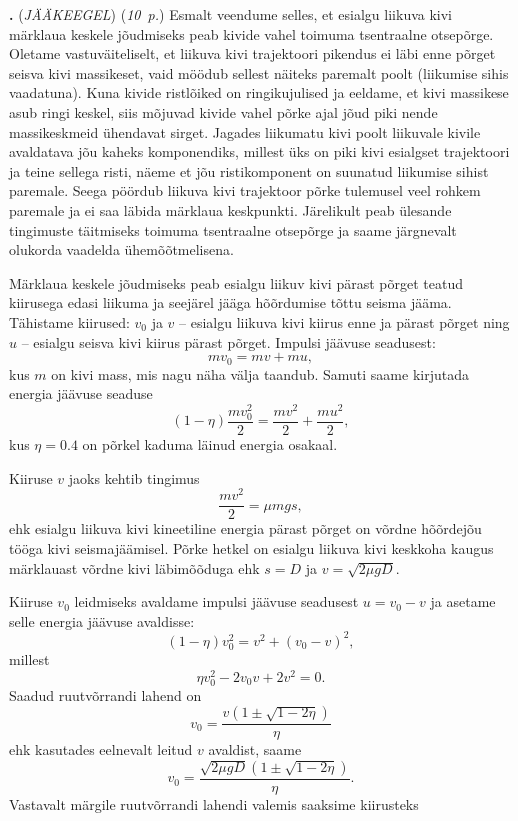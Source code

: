 \documentclass[12pt,a5paper]{article}
\newcommand{\numb}[1]{\vspace{5pt}\textbf{\large #1}}
\newcommand{\nimi}[1]{(\textsl{\small #1})}
\newcommand{\punktid}[1]{(\emph{#1~p.})}
\newcounter{ylesanne}
\newcommand{\yl}[1]{\addtocounter{ylesanne}{1}\numb{\theylesanne.} \nimi{#1} \newblock{}}
\begin{document}
\yl{JÄÄKEEGEL} \punktid{10} Esmalt veendume selles, et esialgu liikuva kivi märklaua keskele jõudmiseks peab kivide vahel toimuma tsentraalne otsepõrge. Oletame vastuväiteliselt, et liikuva kivi trajektoori pikendus ei läbi enne põrget seisva kivi massikeset, vaid möödub sellest näiteks paremalt poolt (liikumise sihis vaadatuna). Kuna kivide ristlõiked on ringikujulised ja eeldame, et kivi massikese asub ringi keskel, siis mõjuvad kivide vahel põrke ajal jõud piki nende massikeskmeid ühendavat sirget. Jagades liikumatu kivi poolt liikuvale kivile avaldatava jõu kaheks komponendiks, millest üks on piki kivi esialgset trajektoori ja teine sellega risti, näeme et jõu ristikomponent on suunatud liikumise sihist paremale. Seega pöördub liikuva kivi trajektoor põrke tulemusel veel rohkem paremale ja ei saa läbida märklaua keskpunkti. Järelikult peab ülesande tingimuste täitmiseks toimuma tsentraalne otsepõrge ja saame järgnevalt olukorda vaadelda ühemõõtmelisena.

Märklaua keskele jõudmiseks peab esialgu liikuv kivi pärast põrget teatud kiirusega edasi liikuma ja seejärel jääga hõõrdumise tõttu seisma jääma. Tähistame kiirused: $v_0$ ja $v$ -- esialgu liikuva kivi kiirus enne ja pärast põrget ning $u$ -- esialgu seisva kivi kiirus pärast põrget. Impulsi jäävuse seadusest:
\begin{equation}
mv_0 = mv + mu,
\end{equation}
kus $m$ on kivi mass, mis nagu näha välja taandub. Samuti saame kirjutada energia jäävuse seaduse
\begin{equation}
\left(1-\eta\right)\frac{mv_0^2}{2} = \frac{mv^2}{2} + \frac{mu^2}{2},
\end{equation}
kus $\eta = \num{0.4}$ on põrkel kaduma läinud energia osakaal.

Kiiruse $v$ jaoks kehtib tingimus
\begin{equation}
\frac{mv^2}{2} = \mu mgs,
\end{equation}
ehk esialgu liikuva kivi kineetiline energia pärast põrget on võrdne hõõrdejõu tööga kivi seismajäämisel. Põrke hetkel on esialgu liikuva kivi keskkoha kaugus märklauast võrdne kivi läbimõõduga ehk $s = D$ ja $v = \sqrt{2\mu gD}$.

Kiiruse $v_0$ leidmiseks avaldame impulsi jäävuse seadusest $u = v_0 - v$ ja asetame selle energia jäävuse avaldisse:
\begin{equation}
\left( 1 - \eta \right)v_0^2 = v^2 + \left(v_0 - v\right)^2, 
\end{equation}
millest
\begin{equation}
\eta v_0^2 - 2v_0 v + 2v^2 = 0.
\end{equation}
Saadud ruutvõrrandi lahend on
\begin{equation}
v_0 =  \frac{v\left( 1 \pm \sqrt{1-2\eta} \right)}{\eta}
\end{equation}
ehk kasutades eelnevalt leitud $v$ avaldist, saame
\begin{equation}
v_0 =  \frac{\sqrt{2\mu gD}\left( 1 \pm \sqrt{1-2\eta} \right)}{\eta}.
\end{equation}
Vastavalt märgile ruutvõrrandi lahendi valemis saaksime kiirusteks
\end{document}
